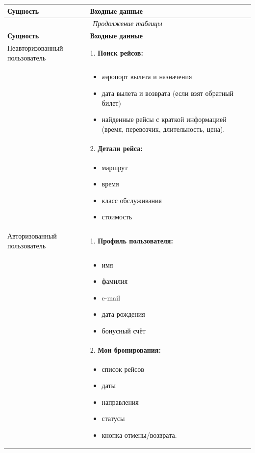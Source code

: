 \begin{longtable}{|p{5cm}|p{11.5cm}|}
    \hline
    \textbf{Сущность} & \textbf{Входные данные} \\
    \hline
    \endfirsthead
    \multicolumn{2}{c}{\textit{Продолжение таблицы \thetable{}}} \\
    \hline
    \textbf{Сущность} & \textbf{Входные данные} \\
    \hline
    \endhead
    Неавторизованный пользователь &
    1. \textbf{Поиск рейсов:}\\[-0.5em]
    & \begin{itemize} [noitemsep, topsep=0pt]
        \item аэропорт вылета и назначения
        \item дата вылета и возврата (если взят обратный билет)
        \item найденные рейсы с краткой информацией (время, перевозчик, длительность, цена).
    \end{itemize}\\
    & 2. \textbf{Детали рейса:} \\
    & \begin{itemize}
        \item маршрут
        \item время
        \item класс обслуживания
        \item стоимость
    \end{itemize}\\
    \hline
    Авторизованный пользователь &
    1. \textbf{Профиль пользователя:} \\
    & \begin{itemize}
        \item имя
        \item фамилия
        \item e-mail
        \item дата рождения
        \item бонусный счёт
    \end{itemize} \\
    & 2. \textbf{Мои бронирования:}\\
    & \begin{itemize}
        \item список рейсов
        \item даты
        \item направления
        \item статусы
        \item кнопка отмены/возврата.

\end{itemize}
\end{longtable}
